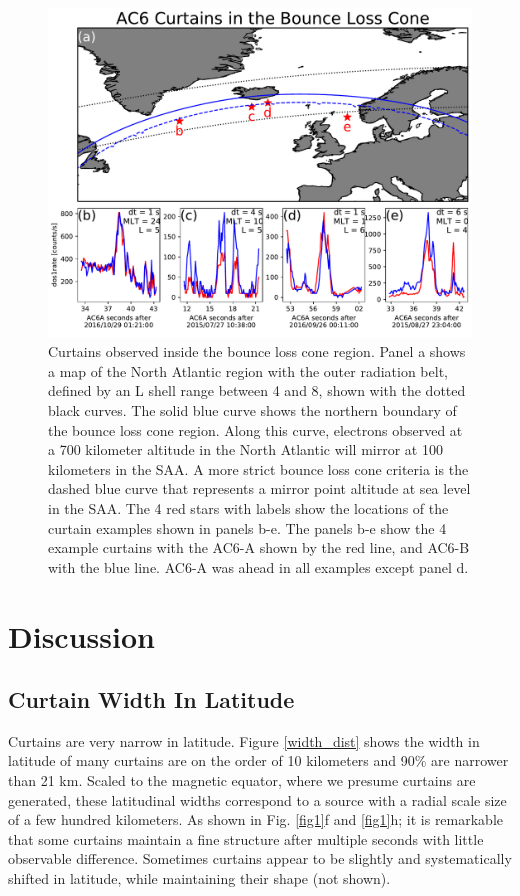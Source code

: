 \documentclass[draft]{agujournal2019}
\begin{document}
\begin{figure}
\includegraphics[width=\textwidth]{fig3.pdf}
\caption{Curtains observed inside the bounce loss cone region. Panel a shows a map of the North Atlantic region with the outer radiation belt, defined by an L shell range between 4 and 8, shown with the dotted black curves. The solid blue curve shows the northern boundary of the bounce loss cone region. Along this curve, electrons observed at a 700 kilometer altitude in the North Atlantic will mirror at 100 kilometers in the SAA. A more strict bounce loss cone criteria is the dashed blue curve that represents a mirror point altitude at sea level in the SAA. The 4 red stars with labels show the locations of the curtain examples shown in panels b-e. The panels b-e show the 4 example curtains with the AC6-A shown by the red line, and AC6-B with the blue line. AC6-A was ahead in all examples except panel d.}
\label{fig3}
\end{figure}

\section{Discussion} \label{discussion}
\subsection{Curtain Width In Latitude}
Curtains are very narrow in latitude. Figure \ref{width_dist} shows the width in latitude of many curtains are on the order of 10 kilometers and 90\% are narrower than 21 km. Scaled to the magnetic equator, where we presume curtains are generated, these latitudinal widths correspond to a source with a radial scale size of a few hundred kilometers. As shown in Fig. \ref{fig1}f and \ref{fig1}h; it is remarkable that some curtains maintain a fine structure after multiple seconds with little observable difference. Sometimes curtains appear to be slightly and systematically shifted in latitude, while maintaining their shape (not shown).
\end{document}
